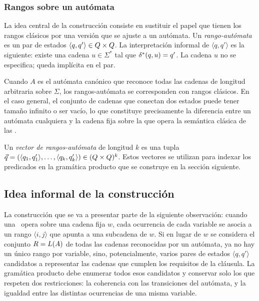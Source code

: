 \subsubsection{Rangos sobre un autómata}

La idea central de la construcción consiste en sustituir el papel que tienen los rangos clásicos por una versión que se ajuste a un autómata. Un \emph{rango-autómata} es un par de estados $\langle q, q' \rangle \in Q \times Q$. La interpretación informal de $\langle q, q' \rangle$ es la siguiente: existe una cadena $u \in \Sigma^{*}$ tal que $\delta^{*}(q, u) = q'$. La cadena $u$ no se especifica; queda implícita en el par.

Cuando $A$ es el autómata canónico que reconoce todas las cadenas de longitud arbitraria sobre $\Sigma$, los rangos-autómata se corresponden con rangos clásicos. En el caso general, el conjunto de cadenas que conectan dos estados puede tener tamaño infinito o ser vacío, lo que constituye precisamente la diferencia entre un autómata cualquiera y la cadena fija sobre la que opera la semántica clásica de las \PRCG.

Un \emph{vector de rangos-autómata} de longitud $k$ es una tupla $\vec{q} = (\langle q_1, q'_1 \rangle, \dots, \langle q_k, q'_k \rangle) \in (Q \times Q)^{k}$. Estos vectores se utilizan para indexar los predicados en la gramática producto que se construye en la sección siguiente.

\subsection{Idea informal de la construcción}\label{sec:idea}

La construcción que se va a presentar parte de la siguiente observación: cuando una \PRCG\ opera sobre una cadena fija $w$, cada ocurrencia de cada variable se asocia a un rango $\langle i, j \rangle$ que apunta a una subcadena de $w$. Si en lugar de $w$ se considera el conjunto $R = L(A)$ de todas las cadenas reconocidas por un autómata, ya no hay un único rango por variable, sino, potencialmente, varios pares de estados $\langle q, q' \rangle$ candidatos a representar las cadenas que cumplen los requisitos de la cláusula. La gramática producto debe enumerar todos esos candidatos y conservar solo los que respeten dos restricciones: la coherencia con las transiciones del autómata, y la igualdad entre las distintas ocurrencias de una misma variable.

